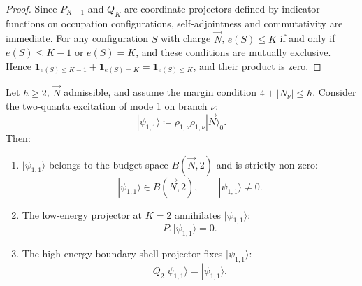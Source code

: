 \begin{proof}
Since $P_{K-1}$ and $Q_K$ are coordinate projectors defined by indicator functions on occupation configurations, self-adjointness and commutativity are immediate.
For any configuration $S$ with charge $\vec{N}$, $e(S) \le K$ if and only if $e(S) \le K-1$ or $e(S) = K$, and these conditions are mutually exclusive. Hence $\mathbf{1}_{e(S) \le K-1} + \mathbf{1}_{e(S) = K} = \mathbf{1}_{e(S) \le K}$, and their product is zero.
\end{proof}

\begin{lemma}
\label{lem:app_discard_double_mode_one}
Let $h \ge 2$, $\vec{N}$ admissible, and assume the margin condition $4 + |N_\nu| \le h$.
Consider the two-quanta excitation of mode 1 on branch $\nu$:
\begin{equation}
|\psi_{1, 1}\rangle \coloneqq \rho_{1, \nu} \rho_{1, \nu} |\vec{N}\rangle_0.
\end{equation}
Then:
\begin{enumerate}
    \item $|\psi_{1, 1}\rangle$ belongs to the budget space $B(\vec{N}, 2)$ and is strictly non-zero:
    \begin{equation}
    |\psi_{1, 1}\rangle \in B(\vec{N}, 2), \qquad |\psi_{1, 1}\rangle \neq 0.
    \end{equation}
    \item The low-energy projector at $K = 2$ annihilates $|\psi_{1, 1}\rangle$:
    \begin{equation}
    P_1 |\psi_{1, 1}\rangle = 0.
    \end{equation}
    \item The high-energy boundary shell projector fixes $|\psi_{1, 1}\rangle$:
    \begin{equation}
    Q_2 |\psi_{1, 1}\rangle = |\psi_{1, 1}\rangle.
    \end{equation}
\end{enumerate}
\end{lemma}

